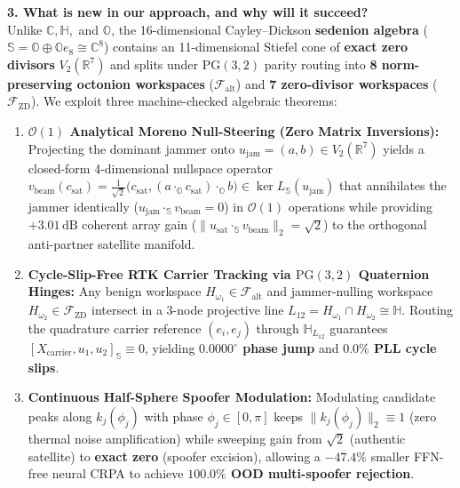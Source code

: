 \documentclass[10pt,a4paper]{article}
\newcommand{\R}{\mathbb{R}}
\newcommand{\C}{\mathbb{C}}
\newcommand{\Ha}{\mathbb{H}}
\newcommand{\Oc}{\mathbb{O}}
\newcommand{\Se}{\mathbb{S}}
\newcommand{\PG}{\mathrm{PG}}
\begin{document}
\textbf{3. What is new in our approach, and why will it succeed?}\\
Unlike $\C, \Ha,$ and $\Oc$, the 16-dimensional Cayley--Dickson \textbf{sedenion algebra} ($\Se = \Oc \oplus \Oc e_8 \cong \C^8$) contains an 11-dimensional Stiefel cone of \textbf{exact zero divisors} $V_2(\R^7)$ and splits under $\PG(3,2)$ parity routing into \textbf{8 norm-preserving octonion workspaces} ($\mathcal{F}_{\mathrm{alt}}$) and \textbf{7 zero-divisor workspaces} ($\mathcal{F}_{\mathrm{ZD}}$). We exploit three machine-checked algebraic theorems:
\begin{enumerate}
    \item \textbf{$\mathcal{O}(1)$ Analytical Moreno Null-Steering (Zero Matrix Inversions):} Projecting the dominant jammer onto $u_{\mathrm{jam}} = (a, b) \in V_2(\R^7)$ yields a closed-form 4-dimensional nullspace operator $v_{\mathrm{beam}}(c_{\mathrm{sat}}) = \frac{1}{\sqrt{2}}\big(c_{\mathrm{sat}}, (a \cdot_{\Oc} c_{\mathrm{sat}}) \cdot_{\Oc} b\big) \in \ker L_{\Se}(u_{\mathrm{jam}})$ that annihilates the jammer identically ($u_{\mathrm{jam}} \cdot_{\Se} v_{\mathrm{beam}} = 0$) in $\mathcal{O}(1)$ operations while providing $+3.01\,\mathrm{dB}$ coherent array gain ($\|u_{\mathrm{sat}} \cdot_{\Se} v_{\mathrm{beam}}\|_2 = \sqrt{2}$) to the orthogonal anti-partner satellite manifold.
    \item \textbf{Cycle-Slip-Free RTK Carrier Tracking via $\PG(3,2)$ Quaternion Hinges:} Any benign workspace $H_{\omega_1} \in \mathcal{F}_{\mathrm{alt}}$ and jammer-nulling workspace $H_{\omega_2} \in \mathcal{F}_{\mathrm{ZD}}$ intersect in a 3-node projective line $L_{12} = H_{\omega_1} \cap H_{\omega_2} \cong \Ha$. Routing the quadrature carrier reference $(e_i, e_j)$ through $\Ha_{L_{12}}$ guarantees $[X_{\mathrm{carrier}}, u_1, u_2]_{\Se} \equiv 0$, yielding \textbf{$0.0000^\circ$ phase jump} and \textbf{$0.0\%$ PLL cycle slips}.
    \item \textbf{Continuous Half-Sphere Spoofer Modulation:} Modulating candidate peaks along $k_j(\phi_j)$ with phase $\phi_j \in [0,\pi]$ keeps $\|k_j(\phi_j)\|_2 \equiv 1$ (zero thermal noise amplification) while sweeping gain from $\sqrt{2}$ (authentic satellite) to \textbf{exact zero} (spoofer excision), allowing a $-47.4\%$ smaller FFN-free neural CRPA to achieve \textbf{$100.0\%$ OOD multi-spoofer rejection}.
\end{enumerate}
\end{document}
